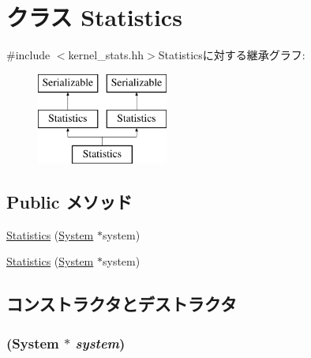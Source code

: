 \hypertarget{classMipsISA_1_1Kernel_1_1Statistics}{
\section{クラス Statistics}
\label{classMipsISA_1_1Kernel_1_1Statistics}
}


{\ttfamily \#include $<$kernel\_\-stats.hh$>$}Statisticsに対する継承グラフ:\begin{figure}[H]
\begin{center}
\leavevmode
\includegraphics[height=3cm]{classMipsISA_1_1Kernel_1_1Statistics}
\end{center}
\end{figure}
\subsection*{Public メソッド}
\begin{DoxyCompactItemize}
\item 
\hyperlink{classMipsISA_1_1Kernel_1_1Statistics_a83aac6d65afe578fbf92b926ce7c1c3c}{Statistics} (\hyperlink{classSystem}{System} $\ast$system)
\item 
\hyperlink{classMipsISA_1_1Kernel_1_1Statistics_a83aac6d65afe578fbf92b926ce7c1c3c}{Statistics} (\hyperlink{classSystem}{System} $\ast$system)
\end{DoxyCompactItemize}


\subsection{コンストラクタとデストラクタ}
\hypertarget{classMipsISA_1_1Kernel_1_1Statistics_a83aac6d65afe578fbf92b926ce7c1c3c}{
\subsubsection[{Statistics}]{ ({\bf System} $\ast$ {\em system})}}
\label{classMipsISA_1_1Kernel_1_1Statistics_a83aac6d65afe578fbf92b926ce7c1c3c}



